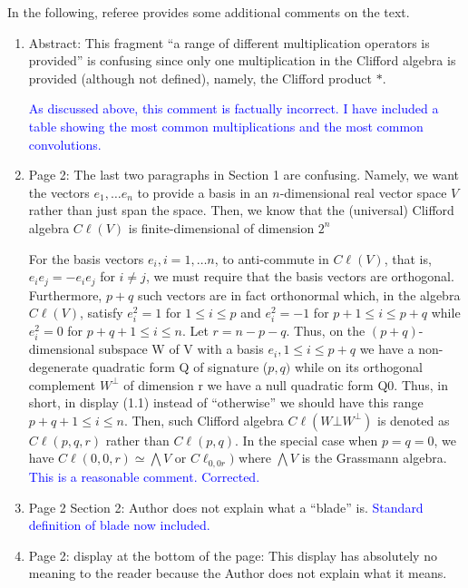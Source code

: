 \documentclass{article}
\newcommand{\cliff}[1]{\ensuremath{C\ell\left(#1\right)}}
\begin{document}
In the following, referee provides some additional comments on the text.

\begin{enumerate}
  \item Abstract: This fragment “a range of different multiplication operators is provided” is confusing since only one multiplication in the Clifford algebra is provided (although not defined),
    namely, the Clifford product $*$.

    \textcolor{blue}{As discussed above, this comment is factually
      incorrect. I have included a table showing the most common
      multiplications and the most common convolutions.    }


\item Page 2: The last two paragraphs in Section 1 are confusing.
  Namely, we want the vectors $e_1,\ldots e_n$ to provide a basis in
  an $n$-dimensional real vector space $V$ rather than just span the
  space.  Then, we know that the (universal) Clifford algebra
  \cliff{V} is finite-dimensional of dimension $2^n$

  For the basis vectors $e_i , i = 1, \ldots n$, to anti-commute in
  \cliff{V}, that is, $e_i e_j = -e_i e_j$ for $i\neq j$, we must
  require that the basis vectors are orthogonal.  Furthermore, $p + q$
  such vectors are in fact orthonormal which, in the algebra
  \cliff{V}, satisfy $e_i^2 = 1$ for $1\leq i\leq p$ and $e_i^2 = -1$
  for $p+1\leq i\leq p+q$ while $e_i^2 = 0$ for $p + q + 1 \leq i\leq
  n$.  Let $r=n-p-q$.  Thus, on the $(p + q)$-dimensional subspace W
  of V with a basis $e_i, 1\leq i \leq p+q$ we have a non-degenerate
  quadratic form Q of signature ($p, q)$ while on its orthogonal
  complement $W^\bot$ of dimension r we have a null quadratic form
  Q0. Thus, in short, in display (1.1) instead of “otherwise” we
  should have this range $p + q + 1 \leq i \leq n$.  Then, such
  Clifford algebra \cliff{W\bot W^\bot} is denoted as \cliff{p,q,r}
  rather than \cliff{p,q}. In the special case when $p = q = 0$, we
  have $\cliff{0,0,r}\simeq\bigwedge V$ or $C\ell_{0,0r})$ where
  $\bigwedge V$ is the Grassmann algebra.
  \textcolor{blue}{This is a reasonable comment.  Corrected.}

\item  Page 2 Section 2: Author does not
  explain what a “blade” is.
  \textcolor{blue}{Standard definition of blade now included.}
  \item Page 2: display at the bottom of the
page: This display has absolutely no meaning to the reader because the
Author does not explain what it means.


\end{enumerate}
\end{document}
